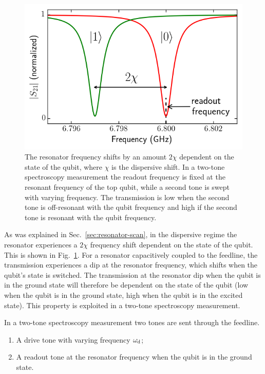         \begin{figure}[tb]
          \centering
          \includegraphics[width=.5\textwidth]{Figures/Qubit characterization/dispersive shift.png}
          \caption{The resonator frequency shifts by an amount $2\chi$ dependent on the state of the qubit, where $\chi$ is the dispersive shift. In a two-tone spectroscopy measurement the readout frequency is fixed at the resonant frequency of the top qubit, while a second tone is swept with varying frequency. The transmission is low when the second tone is off-resonant with the qubit frequency and high if the second tone is resonant with the qubit frequency.}
          \label{fig:dispersive shift}
        \end{figure}

        As was explained in Sec.~\ref{sec:resonator-scan}, in the dispersive regime the resonator experiences a $2 \chi$ frequency shift dependent on the state of the qubit. This is shown in Fig.~\ref{fig:dispersive shift}. For a resonator capacitively coupled to the feedline, the transmission experiences a dip at the resonator frequency, which shifts when the qubit's state is switched. The transmission at the resonator dip when the qubit is in the ground state will therefore be dependent on the state of the qubit (low when the qubit is in the ground state, high when the qubit is in the excited state). This property is exploited in a two-tone spectroscopy measurement.

        In a two-tone spectroscopy measurement two tones are sent through the feedline.
        \begin{enumerate}
          \item A drive tone with varying frequency $\omega_\text{d}$;
          \item A readout tone at the resonator frequency when the qubit is in the ground state.
        \end{enumerate}

